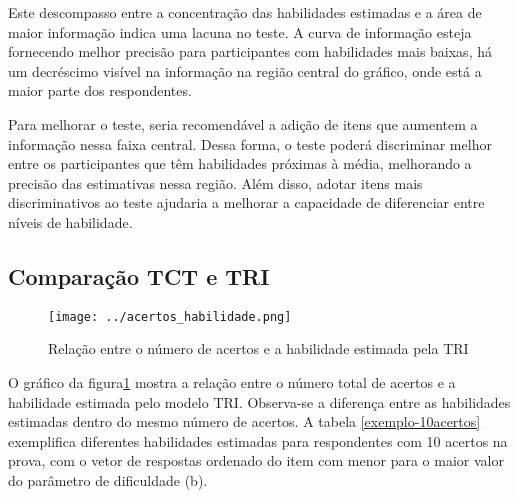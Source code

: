 Este descompasso entre a concentração das habilidades estimadas e a área de maior informação indica uma lacuna no teste. A curva de informação esteja fornecendo melhor precisão para participantes com habilidades mais baixas, há um decréscimo visível na informação na região central do gráfico, onde está a maior parte dos respondentes. 

Para melhorar o teste, seria recomendável a adição de itens que aumentem a informação nessa faixa central. Dessa forma, o teste poderá discriminar melhor entre os participantes que têm habilidades próximas à média, melhorando a precisão das estimativas nessa região. Além disso, adotar itens mais discriminativos ao teste ajudaria a melhorar a capacidade de diferenciar entre níveis de habilidade.

\subsection{Comparação TCT e TRI}

\begin{figure}[!hbt]
	\centering
		\caption{Relação entre o número de acertos e a habilidade estimada pela TRI}
	\texttt{[image: ../acertos\_habilidade.png]}
	\parbox{\textwidth}{
		\centering %
	}
	\label{fig:acertos_habilidade}
\end{figure}

O gráfico da figura\ref{fig:acertos_habilidade} mostra a relação entre o número total de acertos e a habilidade estimada pelo modelo TRI. Observa-se a diferença entre as habilidades estimadas dentro do mesmo número de acertos. A tabela \ref{exemplo-10acertos} exemplifica diferentes habilidades estimadas para respondentes com 10 acertos na prova, com o vetor de respostas ordenado do item com menor para o maior valor do parâmetro de dificuldade (b).


